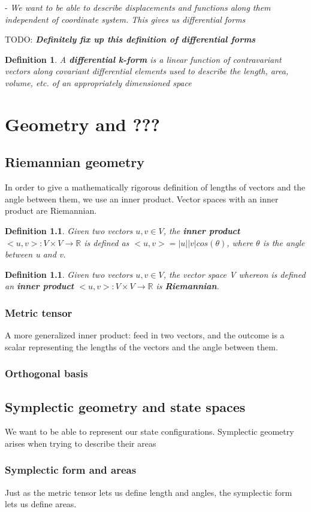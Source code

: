 \documentclass{book}
\newtheorem{defn}[equation]{Definition}
\begin{document}
- \emph{We want to be able to describe displacements and functions along them independent of coordinate system. This gives us differential forms}

TODO: \emph{\textbf{Definitely fix up this definition of differential forms}}

\begin{defn}
	A \textbf{differential k-form} is a linear function of contravariant vectors along covariant differential elements used to describe the length, area, volume, etc. of an appropriately dimensioned space 
\end{defn}


\chapter{Geometry and ???}

\section{Riemannian geometry}
In order to give a mathematically rigorous definition of lengths of vectors and the angle between them, we use an inner product. Vector spaces with an inner product are Riemannian.

\begin{defn}
	Given two vectors $u,v \in V$, the \textbf{inner product} $<u,v> : V \times V \to \mathbb{R}$ is defined as $<u,v> = |u||v|cos(\theta)$, where $\theta$ is the angle between u and v. 
\end{defn}
\begin{defn}
	Given two vectors $u,v \in V$, the vector space V whereon is defined an \textbf{inner product} $<u,v> : V \times V \to \mathbb{R}$ is \textbf{Riemannian}.
	\end{defn}


\subsection{Metric tensor}
A more generalized inner product: feed in two vectors, and the outcome is a scalar representing the lengths of the vectors and the angle between them. 
\subsection{Orthogonal basis}

\section{Symplectic geometry and state spaces}
We want to be able to represent our state configurations. Symplectic geometry arises when trying to describe their areas

\subsection{Symplectic form and areas}
Just as the metric tensor lets us define length and angles, the symplectic form lets us define areas. 
\end{document}
